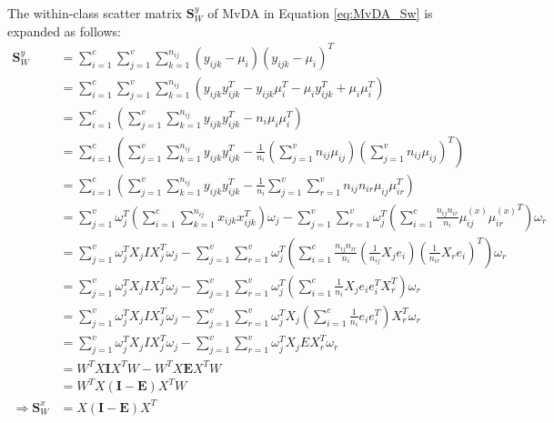 \begin{appendix}
    The within-class scatter matrix $\boldsymbol{S}^y_W$ of MvDA in Equation \eqref{eq:MvDA_Sw} is expanded as follows:
    \begin{equation}
        \begin{split}
            \boldsymbol{S}^y_W &= \sum_{i=1}^{c}\sum_{j=1}^{v}\sum_{k=1}^{n_{ij}}(y_{ijk}-\mu_i)(y_{ijk}-\mu_i)^T \\
            &= \sum_{i=1}^{c}\sum_{j=1}^{v}\sum_{k=1}^{n_{ij}}\left(y_{ijk}y_{ijk}^T - y_{ijk}\mu_i^T - \mu_iy_{ijk}^T + \mu_i\mu_i^T\right) \\
            &= \sum_{i=1}^{c}\left(\sum_{j=1}^{v}\sum_{k=1}^{n_{ij}}y_{ijk}y_{ijk}^T - n_i\mu_i\mu_i^T\right) \\
            &= \sum_{i=1}^{c}\left(\sum_{j=1}^{v}\sum_{k=1}^{n_{ij}}y_{ijk}y_{ijk}^T - \frac{1}{n_i}\left(\sum_{j=1}^{v}n_{ij}\mu_{ij}\right){\left(\sum_{j=1}^{v}n_{ij}\mu_{ij}\right)}^T\right) \\
            &= \sum_{i=1}^{c}\left(\sum_{j=1}^{v}\sum_{k=1}^{n_{ij}}y_{ijk}y_{ijk}^T - \frac{1}{n_i}\sum_{j=1}^{v}\sum_{r=1}^{v}n_{ij}n_{ir}\mu_{ij}\mu_{ir}^T\right) \\
            &= \sum_{j=1}^{v}\omega_j^T\left(\sum_{i=1}^{c}\sum_{k=1}^{n_{ij}}x_{ijk}x_{ijk}^T\right)\omega_j - \sum_{j=1}^{v}\sum_{r=1}^{v}\omega_j^T\left(\sum_{i=1}^{c}\frac{n_{ij}n_{ir}}{n_i}\mu^{(x)}_{ij}{\mu^{(x)}_{ir}}^T\right)\omega_r \\
            &= \sum_{j=1}^{v}\omega_j^T X_j I X_j^T\omega_j - \sum_{j=1}^{v}\sum_{r=1}^{v}\omega_j^T\left(\sum_{i=1}^{c}\frac{n_{ij}n_{ir}}{n_i}\left(\frac{1}{n_{ij}}X_j e_i\right)\left(\frac{1}{n_{ir}}X_r e_i\right)^T\right)\omega_r \\
            &= \sum_{j=1}^{v}\omega_j^T X_j I X_j^T\omega_j - \sum_{j=1}^{v}\sum_{r=1}^{v}\omega_j^T\left(\sum_{i=1}^{c}\frac{1}{n_i}X_j e_i e_i^T X_r^T\right)\omega_r \\
            &= \sum_{j=1}^{v}\omega_j^T X_j I X_j^T\omega_j - \sum_{j=1}^{v}\sum_{r=1}^{v}\omega_j^T X_j\left(\sum_{i=1}^{c}\frac{1}{n_i}e_i e_i^T\right)X_r^T\omega_r \\
            &= \sum_{j=1}^{v}\omega_j^T X_j I X_j^T\omega_j - \sum_{j=1}^{v}\sum_{r=1}^{v}\omega_j^T X_j E X_r^T\omega_r \\
            &= W^T X \boldsymbol{I} X^T W - W^T X \boldsymbol{E} X^T W \\
            &= W^T X \left(\boldsymbol{I} - \boldsymbol{E}\right) X^T W \\
            \Rightarrow \boldsymbol{S}^x_W &= X \left(\boldsymbol{I} - \boldsymbol{E}\right) X^T

\end{split}
\end{equation}
\end{appendix}

